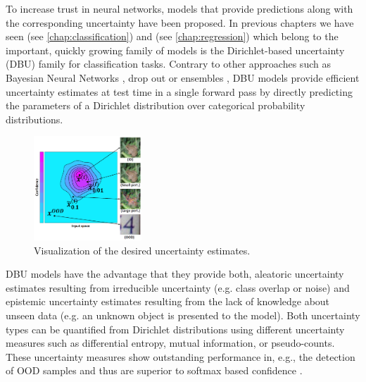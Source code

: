To increase trust in neural networks, models that provide predictions along with the corresponding uncertainty have been proposed. In previous chapters we have seen \PostNetacro{} (see \cref{chap:classification}) and \NatPNacro{} (see \cref{chap:regression}) which belong to the important, quickly growing family of models is the Dirichlet-based uncertainty (DBU) family \citep{malini2018, distribution-distillation, sensoy2018, reverse-kl, charpentier2020, graph_uncertainty, max_gap_id_ood, multifaceted_uncertainty, uncertainty-generative-classifier} for classification tasks. 
Contrary to other approaches such as Bayesian Neural Networks \citep{bayesian-networks, osawa2019, simple-baseline-uncertainty}, drop out \citep{dropout} or ensembles \citep{ensembles}, DBU models provide efficient uncertainty estimates at test time in a single forward pass by directly predicting the parameters of a Dirichlet distribution over categorical probability distributions.
%
\begin{figure}[t]
\centering
\includegraphics[width=0.36\textwidth]{sections/008_icml2021/eval/uncertainty_diagram.png}
\caption{Visualization of the desired uncertainty estimates. 
}
\label{fig:uncertainty_attack_diagram}
\end{figure}
%
DBU models have the advantage that they provide both, aleatoric uncertainty estimates resulting from irreducible uncertainty (e.g. class overlap or noise) and epistemic uncertainty estimates resulting from the lack of knowledge about unseen data (e.g. an unknown object is presented to the model). Both uncertainty types can be quantified from Dirichlet distributions using different uncertainty measures such as differential entropy, mutual information, or pseudo-counts. These uncertainty measures show outstanding performance in, e.g., the detection of OOD samples and thus are superior to softmax based confidence \citep{malini2018, reverse-kl, charpentier2020}.

